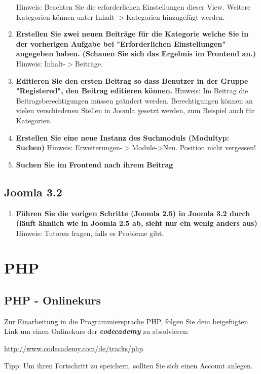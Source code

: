 \documentclass[]{article}
\begin{document}
\begin{enumerate}
Hinweis: Beachten Sie die erforderlichen Einstellungen dieser View. Weitere Kategorien können unter Inhalt-$>$Kategorien hinzugefügt werden.
\item \textbf{Erstellen Sie zwei neuen Beiträge für die Kategorie welche Sie in der vorherigen Aufgabe bei "Erforderlichen Einstellungen" angegeben haben. (Schauen Sie sich das Ergebnis im Frontend an.)} \newline
Hinweis: Inhalt-$>$Beiträge. 
\item \textbf{Editieren Sie den ersten Beitrag so dass Benutzer in der Gruppe "Registered", den Beitrag editieren können.} \newline
Hinweis: Im Beitrag die Beitragsberechtigungen müssen geändert werden. Berechtigungen können an vielen verschiedenen Stellen in Joomla gesetzt werden, zum Beispiel auch für Kategorien.
\item \textbf{Erstellen Sie eine neue Instanz des Suchmoduls (Modultyp: Suchen)} \newline
Hinweis: Erweiterungen-$>$Module->Neu. Position nicht vergessen!
\item \textbf{Suchen Sie im Frontend nach ihrem Beitrag} \newline
\end{enumerate}
\subsection{Joomla 3.2}
\begin{enumerate}
\item \textbf{Führen Sie die vorigen Schritte (Joomla 2.5) in Joomla 3.2 durch (läuft ähnlich wie in Joomla 2.5 ab, sieht nur ein wenig anders aus)}
Hinweis: Tutoren fragen, falls es Probleme gibt.
\end{enumerate}
\section{PHP}
\subsection{PHP - Onlinekurs}
Zur Einarbeitung in die Programmiersprache PHP, folgen Sie dem beigefügten Link um einen Onlinekurs der \textbf{\textit{codecademy}} zu absolvieren:
\begin{list}{}{}
\item \url{http://www.codecademy.com/de/tracks/php}
\end{list}
Tipp: Um ihren Fortschritt zu speichern, sollten Sie sich einen Account anlegen.
\end{document}
